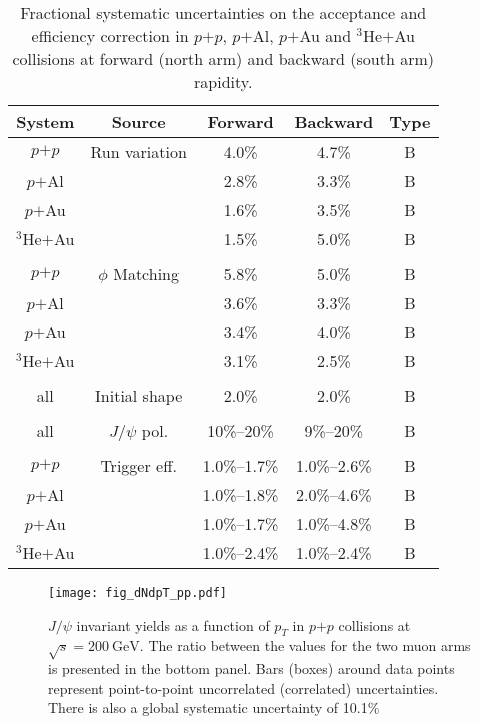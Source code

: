 \documentclass[twocolumn,letterpaper,aps,prc,longbibliography,superscriptaddress,nofootinbib,floatfix]{revtex4-1}
\newcommand{\pt}{\mbox{$p_T$}\xspace}
\newcommand{\pp}{\mbox{$p$$+$$p$}\xspace}
\newcommand{\pau}{\mbox{$p$$+$Au}\xspace}
\newcommand{\pal}{\mbox{$p$$+$Al}\xspace}
\newcommand{\heau}{\mbox{$^{3}$He$+$Au}\xspace}
\newcommand{\jpsi}{\mbox{$J/\psi$}\xspace}
\begin{document}
\begin{table}[tbh]
\caption{\label{tab:sys_acceff}
Fractional systematic uncertainties on the acceptance and efficiency 
correction in \pp, \pal, \pau and \heau collisions at forward (north 
arm) and backward (south arm) rapidity.
}
\begin{ruledtabular} \begin{tabular}{ccccc}
System & Source          & Forward        & Backward        & Type\\\hline
\pp    & Run variation     & 4.0\%   & 4.7\%    & B   \\
\pal   &     & 2.8\%   & 3.3\%    & B   \\
\pau   &     & 1.6\%   & 3.5\%    & B   \\
\heau  &     & 1.5\%   & 5.0\%    & B   \\
\\
\pp    &$\phi$ Matching & 5.8\%   & 5.0\%    & B   \\ 
\pal   & & 3.6\%   & 3.3\%    & B   \\
\pau   & & 3.4\%   & 4.0\%    & B   \\
\heau  & & 3.1\%   & 2.5\%    & B   \\
\\
all    & Initial shape  & 2.0\%   & 2.0\%    & B   \\
\\
all    & \jpsi pol.     & 10\%--20\%     & 9\%--20\%       & B   \\ 
\\
\pp    & Trigger eff.     & 1.0\%--1.7\%     & 1.0\%--2.6\%      & B   \\ 
\pal   &      & 1.0\%--1.8\%     & 2.0\%--4.6\%      & B   \\
\pau   &      & 1.0\%--1.7\%     & 1.0\%--4.8\%      & B   \\
\heau  &      & 1.0\%--2.4\%     & 1.0\%--2.4\%      & B   \\
\end{tabular} \end{ruledtabular}
\end{table}

\begin{figure}[tbh]
\texttt{[image: fig\_dNdpT\_pp.pdf]}
\caption{\label{fig:dndpt_pp}
\jpsi invariant yields as a function of \pt in \pp collisions at 
$\sqrt{s}=200~\mathrm{GeV}$. The ratio between the values for the two 
muon arms is presented in the bottom panel. Bars (boxes) around data 
points represent point-to-point uncorrelated (correlated) uncertainties. 
There is also a global systematic uncertainty of 10.1\%}
\end{figure}
\end{document}
